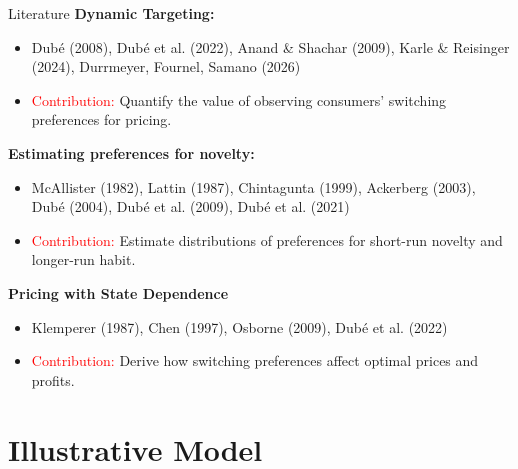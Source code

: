 \documentclass[aspectratio=169,professionalfonts]{beamer}
\begin{document}
\begin{frame}[label=short-3]{Literature}
  \footnotesize
  \textbf{Dynamic Targeting:}
    \begin{itemize}\setlength{\itemsep}{2pt}\setlength{\parsep}{0pt}\setlength{\parskip}{0pt}
      \item Dub\'e (2008), Dub\'e et al. (2022), Anand \& Shachar (2009), Karle \& Reisinger (2024), Durrmeyer, Fournel, Samano (2026)
      \item \textcolor{red}{Contribution:} Quantify the value of observing consumers' switching preferences for pricing.
    \end{itemize}
  \textbf{Estimating preferences for novelty:}
  \begin{itemize}\setlength{\itemsep}{2pt}\setlength{\parsep}{0pt}\setlength{\parskip}{0pt}
      \item McAllister (1982), Lattin (1987), Chintagunta (1999), Ackerberg (2003), Dub\'e (2004), Dub\'e et al. (2009), Dub\'e et al. (2021)
      \item \textcolor{red}{Contribution:} Estimate distributions of preferences for short-run novelty and longer-run habit.
  \end{itemize}
  \textbf{Pricing with State Dependence}
  \begin{itemize}\setlength{\itemsep}{2pt}\setlength{\parsep}{0pt}\setlength{\parskip}{0pt}
    \item Klemperer (1987), Chen (1997), Osborne (2009), Dub\'e et al. (2022)
    \item \textcolor{red}{Contribution:} Derive how switching preferences affect optimal prices and profits.
  \end{itemize}
\end{frame}

\section{Illustrative Model}
\end{document}
